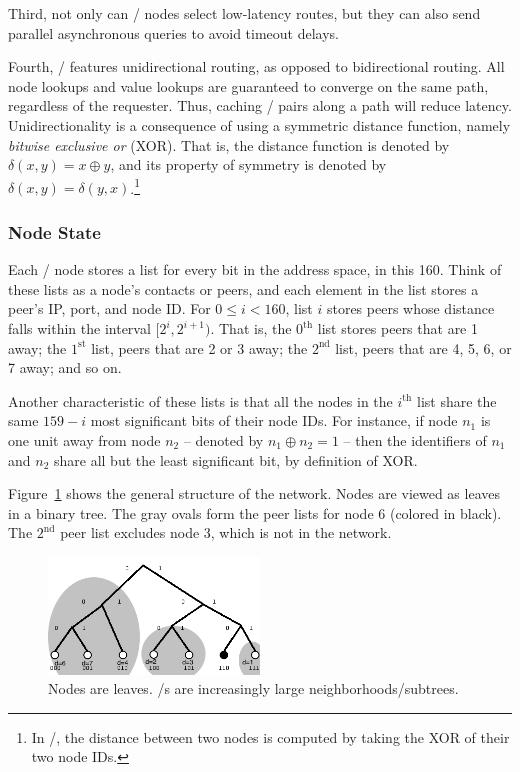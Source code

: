 \documentclass[11pt,twocolumn]{article}
\begin{document}
Third, not only can \Kademlia/ nodes select low-latency routes, but they can also send parallel asynchronous queries to avoid timeout delays.

Fourth, \Kademlia/ features unidirectional routing, as opposed to bidirectional routing.
All node lookups and value lookups are guaranteed to converge on the same path, regardless of the requester.
Thus, caching \kv/ pairs along a path will reduce latency.
Unidirectionality is a consequence of using a symmetric distance function, namely \emph{bitwise exclusive or} (XOR).
That is, the distance function is denoted by $\delta(x,y) = x \oplus y$, and its property of symmetry is denoted by $\delta(x,y) = \delta(y,x)$.\footnote{In \Kademlia/, the distance between two nodes is computed by taking the XOR of their two node IDs.}

\subsubsection{Node State}
Each \Kademlia/ node stores a list for every bit in the address space, in this 160.
Think of these lists as a node's contacts or peers, and each element in the list stores a peer's IP, port, and node ID.
For $0 \leq i < 160$, list $i$ stores peers whose distance falls within the interval $[2^i, 2^{i+1})$.
That is, the $0^{\mathrm{th}}$ list stores peers that are 1 away; the $1^{\mathrm{st}}$ list, peers that are 2 or 3 away; the $2^{\mathrm{nd}}$ list, peers that are 4, 5, 6, or 7 away; and so on.

Another characteristic of these lists is that all the nodes in the $i^{\mathrm{th}}$ list share the same $159 - i$ most significant bits of their node IDs. For instance, if node $n_1$ is one unit away from node $n_2$ -- denoted by $n_1 \oplus n_2 = 1$ -- then the identifiers of $n_1$ and $n_2$ share all but the least significant bit, by definition of XOR.

Figure~\ref{tree} shows the general structure of the network.
Nodes are viewed as leaves in a binary tree.
The gray ovals form the peer lists for node 6 (colored in black).
The $2^{\mathrm{nd}}$ peer list excludes node 3, which is not in the network.

\begin{figure}[h!]
  \centering
  \includegraphics[width=0.5\textwidth]{images/tree}
  \caption{\label{tree}Nodes are leaves. \kbucket/s are increasingly large neighborhoods/subtrees.}
\end{figure}
\end{document}
